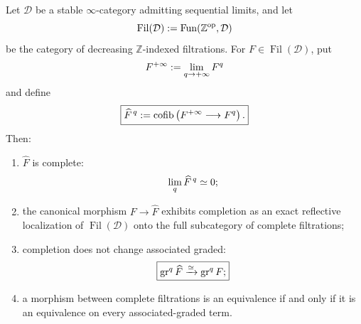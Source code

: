 \begin{lemma}
\label{lem:complete-filtration-reflection}
Let \(\mathcal D\) be a stable \(\infty\)-category admitting sequential limits, and let
\[
    \operatorname{Fil}(\mathcal D)
    :=
    \operatorname{Fun}(\mathbb Z^{\mathrm{op}},\mathcal D)
\]
be the category of decreasing \(\mathbb Z\)-indexed filtrations.  For
\(F\in\operatorname{Fil}(\mathcal D)\), put
\[
    F^{+\infty}
    :=
    \operatorname*{lim}_{q\to+\infty}F^q
\]
and define
\[
\boxed{
    \widehat F^{\,q}
    :=
    \operatorname{cofib}
    \left(
        F^{+\infty}
        \longrightarrow
        F^q
    \right).
}
\]
Then:
\begin{enumerate}
\item \(\widehat F\) is complete:
\[
    \operatorname*{lim}_q\widehat F^{\,q}\simeq0;
\]
\item the canonical morphism \(F\to\widehat F\) exhibits completion as an exact
reflective localization of \(\operatorname{Fil}(\mathcal D)\) onto the full
subcategory of complete filtrations;
\item completion does not change associated graded:
\[
\boxed{
    \operatorname{gr}^q\widehat F\xrightarrow{\simeq}\operatorname{gr}^qF;
}
\]
\item a morphism between complete filtrations is an equivalence if and only if
it is an equivalence on every associated-graded term.
\end{enumerate}
\end{lemma}

